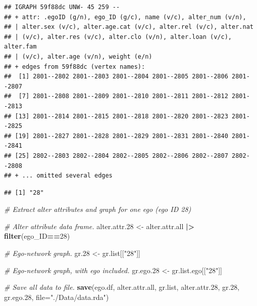 \documentclass[
]{book}
\newenvironment{Shaded}{\begin{snugshade}}{\end{snugshade}}
\newcommand{\AttributeTok}[1]{\textcolor[rgb]{0.13,0.29,0.53}{#1}}
\newcommand{\CommentTok}[1]{\textcolor[rgb]{0.56,0.35,0.01}{\textit{#1}}}
\newcommand{\DecValTok}[1]{\textcolor[rgb]{0.00,0.00,0.81}{#1}}
\newcommand{\FloatTok}[1]{\textcolor[rgb]{0.00,0.00,0.81}{#1}}
\newcommand{\FunctionTok}[1]{\textcolor[rgb]{0.13,0.29,0.53}{\textbf{#1}}}
\newcommand{\NormalTok}[1]{#1}
\newcommand{\OtherTok}[1]{\textcolor[rgb]{0.56,0.35,0.01}{#1}}
\newcommand{\SpecialCharTok}[1]{\textcolor[rgb]{0.81,0.36,0.00}{\textbf{#1}}}
\newcommand{\StringTok}[1]{\textcolor[rgb]{0.31,0.60,0.02}{#1}}
\begin{document}
\begin{verbatim}
## IGRAPH 59f88dc UNW- 45 259 -- 
## + attr: .egoID (g/n), ego_ID (g/c), name (v/c), alter_num (v/n),
## | alter.sex (v/c), alter.age.cat (v/c), alter.rel (v/c), alter.nat
## | (v/c), alter.res (v/c), alter.clo (v/n), alter.loan (v/c), alter.fam
## | (v/c), alter.age (v/n), weight (e/n)
## + edges from 59f88dc (vertex names):
##  [1] 2801--2802 2801--2803 2801--2804 2801--2805 2801--2806 2801--2807
##  [7] 2801--2808 2801--2809 2801--2810 2801--2811 2801--2812 2801--2813
## [13] 2801--2814 2801--2815 2801--2818 2801--2820 2801--2823 2801--2825
## [19] 2801--2827 2801--2828 2801--2829 2801--2831 2801--2840 2801--2841
## [25] 2802--2803 2802--2804 2802--2805 2802--2806 2802--2807 2802--2808
## + ... omitted several edges
\end{verbatim}

\begin{Shaded}
\end{Shaded}

\begin{verbatim}
## [1] "28"
\end{verbatim}

\begin{Shaded}
\begin{Highlighting}[]
\CommentTok{\# Extract alter attributes and graph for one ego (ego ID 28)}

\CommentTok{\# Alter attribute data frame.}
\NormalTok{alter.attr}\FloatTok{.28} \OtherTok{\textless{}{-}}\NormalTok{ alter.attr.all }\SpecialCharTok{|\textgreater{}}
  \FunctionTok{filter}\NormalTok{(ego\_ID}\SpecialCharTok{==}\DecValTok{28}\NormalTok{)}

\CommentTok{\# Ego{-}network graph.}
\NormalTok{gr}\FloatTok{.28} \OtherTok{\textless{}{-}}\NormalTok{ gr.list[[}\StringTok{"28"}\NormalTok{]]}

\CommentTok{\# Ego{-}network graph, with ego included.}
\NormalTok{gr.ego}\FloatTok{.28} \OtherTok{\textless{}{-}}\NormalTok{ gr.list.ego[[}\StringTok{"28"}\NormalTok{]]}

\CommentTok{\# Save all data to file.}
\FunctionTok{save}\NormalTok{(ego.df, alter.attr.all, gr.list, alter.attr}\FloatTok{.28}\NormalTok{, gr}\FloatTok{.28}\NormalTok{, gr.ego}\FloatTok{.28}\NormalTok{, }\AttributeTok{file=}\StringTok{"./Data/data.rda"}\NormalTok{)}
\end{Highlighting}
\end{Shaded}
\end{document}

